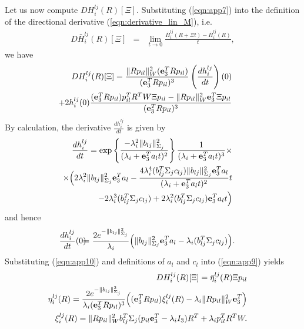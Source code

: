 \documentclass[conference,letterpaper]{ieeeconf}
\begin{document}
Let us now compute $D  H^{lj}_i(R)[\Xi]$.
Substituting (\ref{eqn:app7}) into the definition of the directional derivative (\ref{eqn:derivative_lin_M}),
i.e.
\begin{eqnarray}
D \bar H^{lj}_i(R)[\Xi]
\!\!&\!\!=\!\!&\!\!\lim_{t \to 0}\frac{\bar H^{lj}_i(R + \Xi t) - \bar H^{lj}_i(R)}{t},
\label{eqn:app8}
\end{eqnarray}
we have
\begin{eqnarray}
\hspace{-1.2cm}&&D  H^{lj}_i(R)[\Xi]
=
\frac{\|Rp_{il}\|_W^2({\bf e}_3^T R p_{il})}
{({\bf e}_3^TR p_{il})^3}
\left(\frac{d h_i^{lj}}{dt}\right)(0)
\nonumber\\
\hspace{-1.2cm}&& \hspace{.2cm} + 2h_i^{lj}(0)
\frac{
({\bf e}_3^TR p_{il})p_{il}^TR^TW\Xi p_{il}
-\|Rp_{il}\|_W^2{\bf e}_3^T\Xi p_{il}
}{({\bf e}_3^TR p_{il})^3}
\label{eqn:app9}
\end{eqnarray}
By calculation, the derivative $\frac{d h_i^{lj}}{dt}$ is given by
\begin{eqnarray}
\hspace{-.8cm}&&\frac{d h_i^{lj}}{dt} = 
\exp\left\{
\frac{-\lambda_i^2\|b_{lj}\|^2_{\Sigma_j}}{ (\lambda_i + {\bf e}_3^Ta_{l}t)^2}
\right\}
\frac{1}{(\lambda_i + {\bf e}_3^Ta_{l}t)^3}\times
\nonumber\\
\hspace{-.8cm}&&\times
\Big( 2 \lambda_i^2\|b_{lj}\|^2_{\Sigma_j} {\bf e}_3^Ta_{l} 
- \frac{4 \lambda_i^4(b_{lj}^T \Sigma_j c_{lj})\|b_{lj}\|^2_{\Sigma_j} {\bf e}_3^Ta_{l}  }
{(\lambda_i + {\bf e}_3^Ta_{l}t)^2}t
\nonumber\\
\hspace{-.8cm}&&\hspace{.5cm}
- 2\lambda_i^3(b_{lj}^T \Sigma_j c_{lj}) + 2 \lambda_i^2(b_{lj}^T \Sigma_j c_{lj}){\bf e}_3^Ta_{l} t
\Big)
\end{eqnarray}
and hence
\begin{eqnarray}
\hspace{-0.5cm}
\frac{d h_i^{lj}}{dt}(0) \!\!&\!\!=\!\!&\!\! 
\frac{2e^{-\|b_{lj}\|^2_{\Sigma_j}}}{\lambda_i}
\Big( \|b_{lj}\|_{\Sigma_j}^2 {\bf e}_3^Ta_{l} 
- \lambda_i(b_{lj}^T \Sigma_j c_{lj})
\Big).
\label{eqn:app10}
\end{eqnarray}
Substituting (\ref{eqn:app10}) and definitions of $a_l$ and $c_l$
into (\ref{eqn:app9})
yields
\begin{eqnarray}
\hspace{-.8cm}&&D H^{lj}_i(R)[\Xi]
= \bar \eta_{i}^{lj}(R) \Xi p_{il}
\label{eqn:app13}\\
\hspace{-.8cm}&&\eta_{i}^{lj}(R) =
\frac{2e^{-\|b_{lj}\|^2_{\Sigma_j}}}
{\lambda_i({\bf e}_3^TR p_{il})^3}
\Big(({\bf e}_3^TR p_{il})\xi^{lj}_i(R)
-\lambda_i\|Rp_{il}\|_W^2{\bf e}_3^T
\Big)
\nonumber\\
\hspace{-.8cm}&&\xi^{lj}_i(R) =
 \|Rp_{il}\|_W^2b_{lj}^T \Sigma_j (p_{il} {\bf e}_3^T - \lambda_i I_3)R^T
+ \lambda_i p_{il}^TR^TW.
\nonumber
\end{eqnarray}
\end{document}
